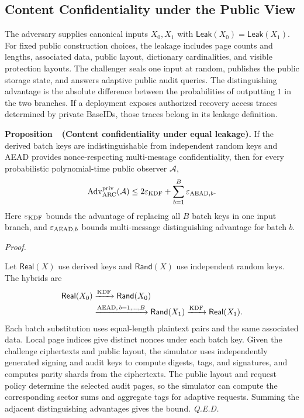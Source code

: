 \documentclass[10pt,journal]{IEEEtran}
\newcounter{proposition}
\newenvironment{proposition}[1]{%
  \refstepcounter{proposition}\par\smallskip\noindent
  \textbf{Proposition~\theproposition\ (#1). }\ignorespaces
}{\par\smallskip}
\newenvironment{claimproof}{\par\noindent\emph{Proof. }\ignorespaces
}{\hfill\textit{Q.E.D.}\par\smallskip}
\begin{document}
\subsection{Content Confidentiality under the Public View}\label{sec:confidentiality}
The adversary supplies canonical inputs $X_0,X_1$ with $\mathsf{Leak}(X_0)=\mathsf{Leak}(X_1)$. For fixed public construction choices, the leakage includes page counts and lengths, associated data, public layout, dictionary cardinalities, and visible protection layouts. The challenger seals one input at random, publishes the public storage state, and answers adaptive public audit queries. The distinguishing advantage is the absolute difference between the probabilities of outputting $1$ in the two branches. If a deployment exposes authorized recovery access traces determined by private BaseIDs, those traces belong in its leakage definition.

\begin{proposition}{Content confidentiality under equal leakage}\label{prop:confidentiality}
If the derived batch keys are indistinguishable from independent random keys and AEAD provides nonce-respecting multi-message confidentiality, then for every probabilistic polynomial-time public observer $\mathcal A$,
\begin{equation}
\operatorname{Adv}^{\rm priv}_{\rm ARC}(\mathcal A)
\leq 2\varepsilon_{\rm KDF}+\sum_{b=1}^{B}\varepsilon_{{\rm AEAD},b}.
\end{equation}
Here $\varepsilon_{\rm KDF}$ bounds the advantage of replacing all $B$ batch keys in one input branch, and $\varepsilon_{{\rm AEAD},b}$ bounds multi-message distinguishing advantage for batch $b$.
\end{proposition}
\begin{claimproof}
Let $\mathsf{Real}(X)$ use derived keys and $\mathsf{Rand}(X)$ use independent random keys. The hybrids are
\begin{equation}
\begin{aligned}
\mathsf{Real}(X_0)
&\xrightarrow{\rm KDF}\mathsf{Rand}(X_0)\\
&\xrightarrow{{\rm AEAD},\,b=1,\ldots,B}\mathsf{Rand}(X_1)
\xrightarrow{\rm KDF}\mathsf{Real}(X_1).
\end{aligned}
\end{equation}
Each batch substitution uses equal-length plaintext pairs and the same associated data. Local page indices give distinct nonces under each batch key. Given the challenge ciphertexts and public layout, the simulator uses independently generated signing and audit keys to compute digests, tags, and signatures, and computes parity shards from the ciphertexts. The public layout and request policy determine the selected audit pages, so the simulator can compute the corresponding sector sums and aggregate tags for adaptive requests. Summing the adjacent distinguishing advantages gives the bound.
\end{claimproof}
\end{document}
